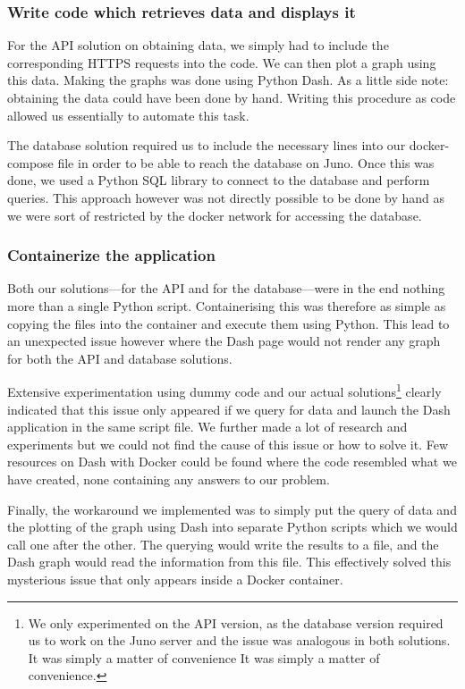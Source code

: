 \subsubsection{Write code which retrieves data and displays it}

For the API solution on obtaining data, we simply had to include the
corresponding HTTPS requests into the code. We can then plot a graph
using this data. Making the graphs was done using Python Dash. As a
little side note: obtaining the data could have been done by hand.
Writing this procedure as code allowed us essentially to automate this
task.

The database solution required us to include the necessary lines into
our docker-compose file in order to be able to reach the database on
Juno. Once this was done, we used a Python SQL library to connect to
the database and perform queries. This approach however was not
directly possible to be done by hand as we were sort of restricted by
the docker network for accessing the database. 

\subsubsection{Containerize the application}

Both our solutions---for the API and for the database---were in the
end nothing more than a single Python script. Containerising this was
therefore as simple as copying the files into the container and
execute them using Python. This lead to an unexpected issue however
where the Dash page would not render any graph for both the API and
database solutions.

Extensive experimentation using dummy code and our actual
solutions\footnote{We only experimented on the API version, as the
	database version required us to work on the Juno server and the
	issue was analogous in both solutions. It was simply a matter of
convenience It was simply a matter of convenience.} clearly indicated
that this issue only appeared if we query for data and launch the Dash
application in the same script file. We further made a lot of research
and experiments but we could not find the cause of this issue or how
to solve it. Few resources on Dash with Docker could be found where
the code resembled what we have created, none containing any answers
to our problem.

Finally, the workaround we implemented was to simply put the query of
data and the plotting of the graph using Dash into separate Python
scripts which we would call one after the other. The querying would
write the results to a file, and the Dash graph would read the
information from this file. This effectively solved this mysterious
issue that only appears inside a Docker container.

